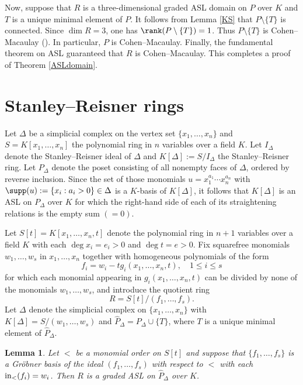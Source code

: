 \documentclass[12pt]{amsart}
\newtheorem{Lemma}[Theorem]{Lemma}
\begin{document}
Now, suppose that $R$ is a three-dimensional graded ASL domain on $P$ over $K$ and $T$ is a unique minimal element of $P$.  It follows from Lemma \ref{KS} that $P \setminus \{T\}$ is connected.  Since $\dim R = 3$, one has $\rank (P \setminus \{T\}) = 1$.  Thus $P \setminus \{T\}$ is Cohen--Macaulay (\cite[Exercise (23.2)]{HIBIred}).  In particular, $P$ is Cohen--Macaulay.  Finally, the fundamental theorem on ASL \cite[Theorem (40.1)]{HIBIred} guaranteed that $R$ is Cohen--Macaulay.  This completes a proof of Theorem \ref{ASLdomain}.  






\section{Stanley--Reisner rings}
Let $\Delta$ be a simplicial complex on the vertex set $\{x_1, \ldots, x_n\}$ and $S=K[x_1, \ldots, x_n]$ the polynomial ring in $n$ variables over a field $K$.  Let $I_\Delta$ denote the Stanley--Reisner ideal of $\Delta$ and $K[\Delta]:=S/I_\Delta$ the Stanley--Reisner ring.  Let $P_\Delta$ denote the poset consisting of all nonempty faces of $\Delta$, ordered by reverse inclusion.  Since the set of those monomials $u=x_1^{a_1} \cdots x_n^{a_n}$ with $\supp(u) := \{x_i : a_i > 0\} \in \Delta$ is a $K$-basis of $K[\Delta]$, it follows that $K[\Delta]$ is an ASL on $P_\Delta$ over $K$ for which the right-hand side of each of its straightening relations is the empty sum $(=0)$. 

Let $S[t] = K[x_1, \ldots, x_n, t]$ denote the polynomial ring in $n+1$ variables over a field $K$ with each $\deg x_i = e_i > 0$ and $\deg t = e > 0$.  Fix squarefree monomials $w_1, \ldots, w_s$ in $x_1, \ldots, x_n$ together with homogeneous polynomials of the form
\[
f_i = w_i - t g_i(x_1,\ldots, x_n, t), \quad 1 \leq i \leq s 
\] 
for which each monomial appearing in $g_i(x_1,\ldots, x_n, t)$ can be divided by none of the monomials $w_1, \ldots, w_s$, and introduce the quotient ring 
\[
R = S[t]/(f_1, \ldots, f_s).
\]
Let $\Delta$ denote the simplicial complex on $\{x_1, \ldots, x_n\}$ with $K[\Delta] = S/(w_1, \ldots, w_s)$ and $\hat{P}_\Delta = P_\Delta \cup \{T\}$, where $T$ is a unique minimal element of $\hat{P}_\Delta$.   

\begin{Lemma}
\label{gradedASL}
   Let $<$ be a monomial order on $S[t]$ and suppose that $\{f_1, \ldots, f_s\}$ is a Gr\"obner basis of the ideal $(f_1, \ldots, f_s)$ with respect to $<$ with each ${\rm in}_<(f_i) = w_i$.  Then $R$ is a graded ASL on $\hat{P}_\Delta$ over $K$. 
\end{Lemma}
\end{document}
